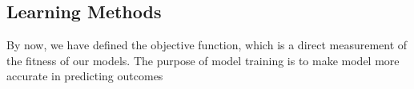 \subsection {Learning Methods}
By now, we have defined the objective function, which is a direct measurement of the fitness of our models. The purpose of model training is to make model more accurate in predicting outcomes